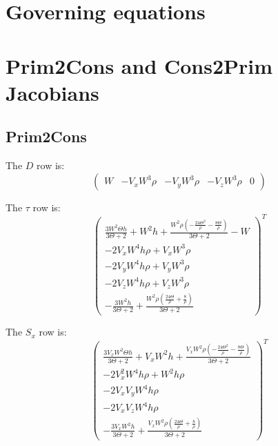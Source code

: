 \documentclass{article}
\begin{document}
\section{Governing equations}

\section{Prim2Cons and Cons2Prim Jacobians}

\subsection{Prim2Cons}
The $D$ row is:
\begin{equation}
  \begin{pmatrix}W & - V_x W^{3} \rho & - V_y W^{3} \rho & - V_z W^{3} \rho & 0\end{pmatrix}
\end{equation}

The $\tau$ row is:
\begin{equation}
  \begin{pmatrix}\frac{3 W^{2} \Theta h}{3 \Theta + 2} + W^{2} h + \frac{W^{2} \rho \left(- \frac{24 \Theta^{2}}{\rho} - \frac{8 \Theta}{\rho}\right)}{3 \Theta + 2} - W \\ - 2 V_{x} W^{4} h \rho + V_{x} W^{3} \rho \\ - 2 V_{y} W^{4} h \rho + V_{y} W^{3} \rho \\ - 2 V_{z} W^{4} h \rho + V_{z} W^{3} \rho \\ - \frac{3 W^{2} h}{3 \Theta + 2} + \frac{W^{2} \rho \left(\frac{24 \Theta}{\rho} + \frac{8}{\rho}\right)}{3 \Theta + 2}\end{pmatrix}^T
\end{equation}

The $S_x$ row is:
\begin{equation}
  \begin{pmatrix}\frac{3 V_{x} W^{2} \Theta h}{3 \Theta + 2} + V_{x} W^{2} h + \frac{V_{x} W^{2} \rho \left(- \frac{24 \Theta^{2}}{\rho} - \frac{8 \Theta}{\rho}\right)}{3 \Theta + 2} \\ - 2 V_{x}^{2} W^{4} h \rho + W^{2} h \rho \\ - 2 V_{x} V_{y} W^{4} h \rho \\ - 2 V_{x} V_{z} W^{4} h \rho \\ - \frac{3 V_{x} W^{2} h}{3 \Theta + 2} + \frac{V_{x} W^{2} \rho \left(\frac{24 \Theta}{\rho} + \frac{8}{\rho}\right)}{3 \Theta + 2}\end{pmatrix}^T
\end{equation}
\end{document}
